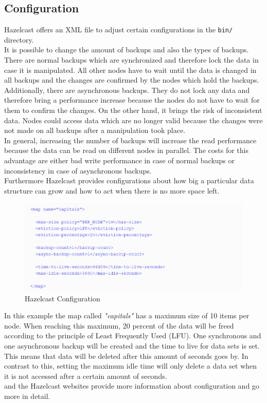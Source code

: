 \subsection*{Configuration}
Hazelcast offers an XML file to adjust certain configurations in the \texttt{bin/} directory. \\
It is possible to change the amount of backups and also the types of backups. There are normal backups which are synchronized and therefore lock the data in case it is manipulated. All other nodes have to wait until the data is changed in all backups and the changes are confirmed by the nodes which hold the backups. Additionally, there are asynchronous backups. They do not lock any data and therefore bring a performance increase because the nodes do not have to wait for them to confirm the changes. On the other hand, it brings the risk of inconsistent data. Nodes could access data which are no longer valid because the changes were not made on all backups after a manipulation took place. \\
In general, increasing the number of backups will increase the read performance because the data can be read on different nodes in parallel. The costs for this advantage are either bad write performance in case of normal backups or inconsistency in case of asynchronous backups.\\ 
Furthermore Hazelcast provides configurations about how big a particular data structure can grow and how to act when there is no more space left. 
\begin{flushleft}
\begin{figure}[ht]
    \includegraphics{content/images/hazelcastXML.PNG}
    \caption{Hazelcast Configuration \cite{johns2015}}
\end{figure}
\end{flushleft}
In this example the map called \textit{"capitals"} has a maximum size of 10 items per node. When reaching this maximum, 20 percent of the data will be freed according to the principle of Least Frequently Used (LFU). One synchronous and one asynchronous backup will be created and the time to live for data sets is set. This means that data will be deleted after this amount of seconds goes by. In contrast to this, setting the maximum idle time will only delete a data set when it is not accessed after a certain amount of seconds.\\
\citeauthor{johns2015} and the Hazelcast websites provide more information about configuration and go more in detail.

